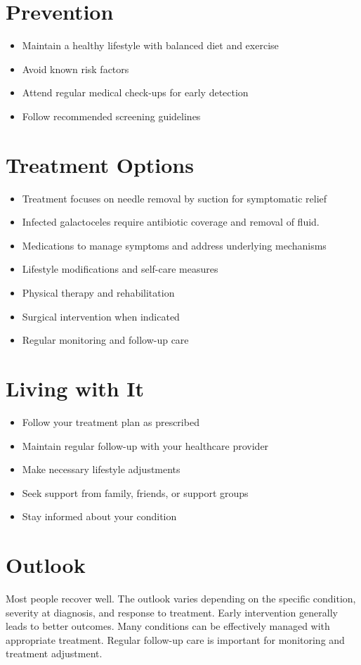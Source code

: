 \section{Prevention}
\begin{itemize}[noitemsep]
  \item Maintain a healthy lifestyle with balanced diet and exercise
  \item Avoid known risk factors
  \item Attend regular medical check-ups for early detection
  \item Follow recommended screening guidelines
\end{itemize}
\section{Treatment Options}
\begin{itemize}[noitemsep]
  \item Treatment focuses on needle removal by suction for symptomatic relief
  \item Infected galactoceles require antibiotic coverage and removal of fluid.
  \item Medications to manage symptoms and address underlying mechanisms
  \item Lifestyle modifications and self-care measures
  \item Physical therapy and rehabilitation
  \item Surgical intervention when indicated
  \item Regular monitoring and follow-up care
\end{itemize}
\section{Living with It}
\begin{itemize}[noitemsep]
  \item Follow your treatment plan as prescribed
  \item Maintain regular follow-up with your healthcare provider
  \item Make necessary lifestyle adjustments
  \item Seek support from family, friends, or support groups
  \item Stay informed about your condition
\end{itemize}
\section{Outlook}
Most people recover well. The outlook varies depending on the specific condition, severity at diagnosis, and response to treatment. Early intervention generally leads to better outcomes. Many conditions can be effectively managed with appropriate treatment. Regular follow-up care is important for monitoring and treatment adjustment.
